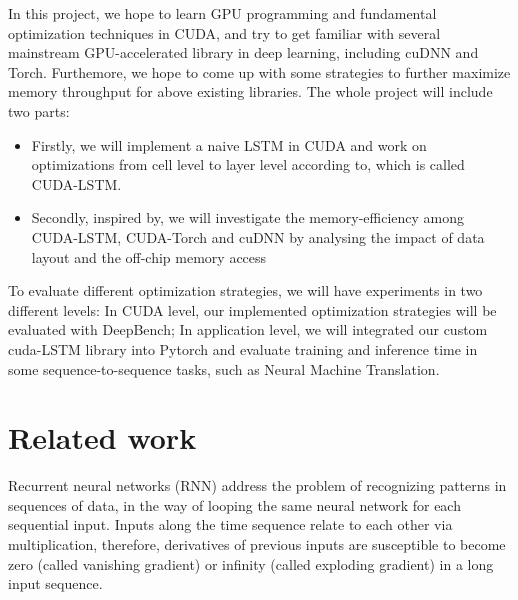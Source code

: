 \documentclass{article}
\begin{document}
In this project, we hope to learn GPU programming and fundamental optimization techniques in CUDA, and try to get familiar with several mainstream GPU-accelerated library in deep learning, including cuDNN and Torch. Furthemore, we hope to come up with some strategies to further maximize memory throughput for above existing libraries. The whole project will include two parts:

\begin{itemize}
  \item Firstly, we will implement a naive LSTM in CUDA and work on optimizations from cell level to layer level according to\cite{appleyard2016optimizing}, which is called CUDA-LSTM.
  \item Secondly, inspired by\cite{li2016optimizing}, we will investigate the memory-efficiency among CUDA-LSTM, CUDA-Torch\cite{PyTorch} and cuDNN by analysing the impact of data layout and the off-chip memory access

\end{itemize}


To evaluate different optimization strategies, we will have experiments in two different levels: In CUDA level, our implemented optimization strategies will be evaluated with DeepBench\cite{DeepBench}; In application level, we will integrated our custom cuda-LSTM library into Pytorch and evaluate training and inference time in some sequence-to-sequence tasks, such as Neural Machine Translation\cite{luong2015effective}.



\section{Related work}

Recurrent neural networks (RNN) address the problem of recognizing patterns in sequences of data, in the way of looping the same neural network for each sequential input. Inputs along the time sequence relate to each other via multiplication, therefore, derivatives of previous inputs are susceptible to become zero (called vanishing gradient) or infinity (called exploding gradient) in a long input sequence. 
\end{document}
